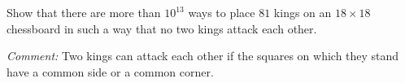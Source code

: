 Show that there are more than $10^{13}$ ways to place $81$ kings on an $18\times 18$ chessboard
in such a way that no two kings attack each other.

\emph{Comment:} Two kings can attack each other if the squares on which
they stand have a common side or a common corner.
